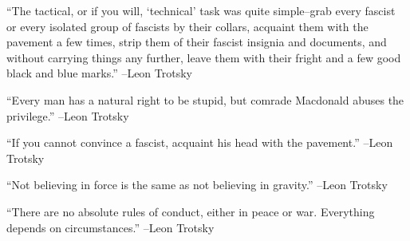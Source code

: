 \documentclass{article}%
\begin{document}
\linebreak%
\vspace{1mm}%
\begin{minipage}{\textwidth}%
\flushleft%
“The tactical, or if you will, ‘technical’ task was quite simple–grab every fascist or every isolated group of fascists by their collars, acquaint them with the pavement a few times, strip them of their fascist insignia and documents, and without carrying things any further, leave them with their fright and a few good black and blue marks.”%
\linebreak%
\vspace{1mm}%
–Leon Trotsky%
\linebreak%
\vspace{1mm}%
\end{minipage}%
\linebreak%
\vspace{1mm}%
\begin{minipage}{\textwidth}%
\flushleft%
“Every man has a natural right to be stupid, but comrade Macdonald abuses the privilege.”%
\linebreak%
\vspace{1mm}%
–Leon Trotsky%
\linebreak%
\vspace{1mm}%
\end{minipage}%
\linebreak%
\vspace{1mm}%
\begin{minipage}{\textwidth}%
\flushleft%
“If you cannot convince a fascist, acquaint his head with the pavement.”%
\linebreak%
\vspace{1mm}%
–Leon Trotsky%
\linebreak%
\vspace{1mm}%
\end{minipage}%
\linebreak%
\vspace{1mm}%
\begin{minipage}{\textwidth}%
\flushleft%
“Not believing in force is the same as not believing in gravity.”%
\linebreak%
\vspace{1mm}%
–Leon Trotsky%
\linebreak%
\vspace{1mm}%
\end{minipage}%
\linebreak%
\vspace{1mm}%
\begin{minipage}{\textwidth}%
\flushleft%
“There are no absolute rules of conduct, either in peace or war. Everything depends on circumstances.”%
\linebreak%
\vspace{1mm}%
–Leon Trotsky%
\linebreak%
\vspace{1mm}%
\end{minipage}%
\end{document}

